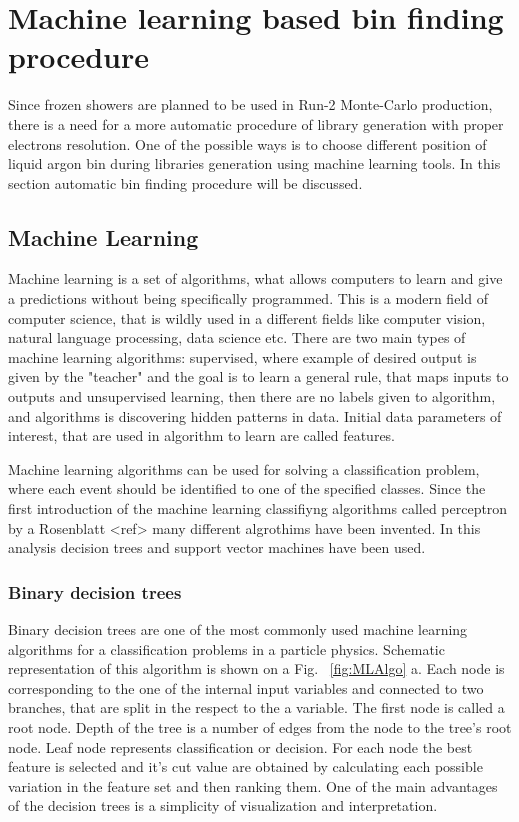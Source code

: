 \section{Machine learning based bin finding procedure}

Since frozen showers are planned to be used in Run-2 Monte-Carlo production, there is a need for a more automatic procedure of library generation with proper electrons resolution. One of the possible ways is to choose different position of liquid argon bin during libraries generation using machine learning tools. In this section automatic bin finding procedure will be discussed.
\subsection{Machine Learning} 

Machine learning is a set of algorithms, what allows computers to learn and give a predictions without being specifically programmed. This is a modern field of computer science, that is wildly used in a different fields like computer vision, natural language processing, data science etc. There are two main types of machine learning algorithms: supervised, where example of desired output is given by the "teacher" and the goal is to learn a general rule, that maps inputs to outputs and unsupervised learning, then there are no labels given to algorithm, and algorithms is discovering hidden patterns in data. Initial data parameters of interest, that are used in algorithm to learn are called features. 

Machine learning algorithms can be used for solving a classification problem, where each event should be identified to one of the specified classes. Since the first introduction of the machine learning classifiyng algorithms called perceptron by a Rosenblatt <ref> many different algrothims have been invented. In this analysis decision trees and support vector machines have been used.

\subsubsection{Binary decision trees}

Binary decision trees are one of the most commonly used machine learning algorithms for a classification problems in a particle physics. Schematic representation of this algorithm is shown on a Fig. ~\ref{fig:MLAlgo} a. Each node is corresponding to the one of the internal input variables and connected to two branches, that are split in the respect to the a variable. The first node is called a root node. Depth of the tree is a number of edges from the node to the tree's root node. Leaf node represents classification or decision.
 For each node the best feature is selected and it's cut value are obtained by calculating each possible variation in the feature set and then ranking them. One of the main advantages of the decision trees is a simplicity of visualization and interpretation. 

